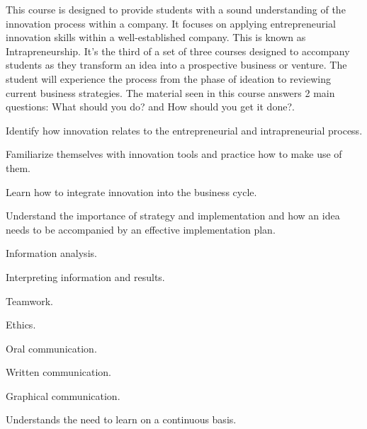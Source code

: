 \begin{syllabus}


\begin{justification}
This course is designed to provide students with a sound understanding of the innovation process within a company. It focuses on applying entrepreneurial innovation skills within a well-established company. This is known as Intrapreneurship.
It's the third of a set of three courses designed to accompany students as they transform an idea into a prospective business or venture. The student will experience the process from the phase of ideation to reviewing current business strategies. 
The material seen in this course answers 2 main questions: What should you do? and How should you get it done?. 
\end{justification}

\begin{goals}
\item Identify how innovation relates to the entrepreneurial and intrapreneurial process.
\item Familiarize themselves with innovation tools and practice how to make use of them.
\item Learn how to integrate innovation into the business cycle.
\item Understand the importance of strategy and implementation and how an idea needs to be accompanied by an effective implementation plan.
\item Information analysis.
\item Interpreting information and results.
\item Teamwork.
\item Ethics.
\item Oral communication.
\item Written communication.
\item Graphical communication.
\item Understands the need to learn on a continuous basis.

\end{goals}

\begin{outcomes}
    \item {} %
    \item {} %
    \item {} %
    \item {} %
    \item {} %
\end{outcomes}


\end{syllabus}
